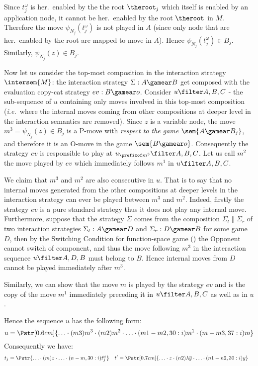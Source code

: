\begin{itemize}[$\bullet$]
\begin{enumerate}
\begin{itemize}
\begin{enumerate}[(a)]
        Since $t_j^\omega$ is her.\ enabled by the the root $\theroot_j$ which itself is enabled by an application node, it cannot be her.\ enabled by the root $\theroot$ in $M$. Therefore the move $\psi_{N_j}(t_j^\omega)$ is not played in $A$ (since only node that are her.\ enabled by the root are mapped to move in $A$). Hence $\psi_{N_j}(t_j^\omega) \in B_j$. Similarly, $\psi_{N_j}(z) \in B_j$.

        Now let us consider the top-most composition in the interaction strategy $\intersem{M}$: the interaction strategy $\Sigma: A \gamear B$ get composed with the evaluation copy-cat strategy $ev:B \gamear o$. Consider $ u \filter A,B,C$ - the sub-sequence of $u$ containing only moves involved in this top-most composition ({\it i.e.}\ where the internal moves coming from other compositions at deeper level in the interaction semantics are removed). Since $z$ is a variable node, the move $m^3 = \psi_{N_j}(z) \in B_j$ is a P-move with \emph{respect to the game} $\sem{A \gamear B_j}$, and therefore it is an O-move in the game $\sem{B \gamear o}$. Consequently the strategy $ev$ is responsible to play at $u_{\prefixof m^3} \filter A, B, C$. Let us call $m^2$ the move played by $ev$ which immediately follows $m^1$ in $u\filter A,B,C$.

        We claim that $m^3$ and $m^2$ are also consecutive in $u$. That is to say that no internal moves generated from the        other compositions at deeper levels in the interaction strategy can ever be played between $m^3$ and $m^2$. Indeed, firstly the strategy $ev$ is a pure standard strategy thus it does not play any internal move. Furthermore, suppose that the strategy $\Sigma$ comes from the composition $\Sigma_l \| \Sigma_r$ of two interaction strategies $\Sigma_l: A \gamear D$ and $\Sigma_r: D\gamear B$ for some game $D$, then by the Switching Condition for function-space game (\cite{hylandong_pcf}) the Opponent cannot switch of component, and thus the move following $m^3$ in the interaction sequence $u \filter A,D,B$ must belong to $B$. Hence internal moves from $D$ cannot be played immediately after $m^3$.

        Similarly, we can show that the move $m$ is played by the strategy $ev$ and is the copy of the move $m^1$ immediately preceding it in $u\filter A,B,C$ as well as in $u$.

        Hence the sequence $u$ has the following form:
        $$u = \Pstr[0.6cm]{ \ldots \cdot (m3){m^3} \cdot
                    (m2){m^2} \cdot \ldots \cdot
                    (m1-m2,30:i){m^1} \cdot (m-m3,37:i){m} } $$
        Consequently we have:
        \begin{align*}
        t_j &= \Pstr{ \ldots \cdot (m)z \cdot \ldots \cdot (n-m,30:i){t_j^\omega} }  &
        t'&= \Pstr[0.7cm]{ \ldots \cdot z \cdot (n2){\lambda \overline{y}} \cdot \ldots \cdot (n1-n2,30:i){y} }
        \end{align*}


\end{enumerate}
\end{itemize}
\end{enumerate}
\end{itemize}
